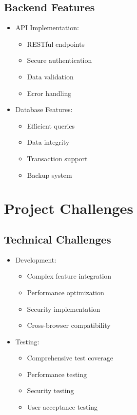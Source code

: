 \subsection{Backend Features}
\begin{itemize}
    \item API Implementation:
    \begin{itemize}
        \item RESTful endpoints
        \item Secure authentication
        \item Data validation
        \item Error handling
    \end{itemize}
    \item Database Features:
    \begin{itemize}
        \item Efficient queries
        \item Data integrity
        \item Transaction support
        \item Backup system
    \end{itemize}
\end{itemize}

\section{Project Challenges}
\subsection{Technical Challenges}
\begin{itemize}
    \item Development:
    \begin{itemize}
        \item Complex feature integration
        \item Performance optimization
        \item Security implementation
        \item Cross-browser compatibility
    \end{itemize}
    \item Testing:
    \begin{itemize}
        \item Comprehensive test coverage
        \item Performance testing
        \item Security testing
        \item User acceptance testing
    \end{itemize}
\end{itemize}

